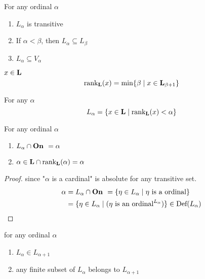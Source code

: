 \documentclass[11pt]{article}
\begin{document}
\begin{lemma}[]
For any ordinal \(\alpha\)
\begin{enumerate}
\item \(L_\alpha\) is transitive
\item If \(\alpha<\beta\), then \(L_\alpha\subseteq L_\beta\)
\item \(L_\alpha\subseteq V_\alpha\)
\end{enumerate}
\end{lemma}

\begin{definition}[]
\(x\in\textbf{L}\)
\begin{equation*}
\text{rank}_{\textbf{L}}(x)=\min\{\beta\mid x\in\textbf{L}_{\beta+1}\}
\end{equation*}
\end{definition}

\begin{lemma}[]
For any \(\alpha\)
\begin{equation*}
L_\alpha=\{x\in\textbf{L}\mid\text{rank}_{\textbf{L}}(x)<\alpha\}
\end{equation*}
\end{lemma}

\begin{lemma}[]
For any ordinal \(\alpha\)
\begin{enumerate}
\item \(L_\alpha\cap\textbf{On }=\alpha\)
\item \(\alpha\in\textbf{L}\cap\text{rank}_{\textbf{L}}(\alpha)=\alpha\)
\end{enumerate}
\end{lemma}

\begin{proof}
since "\(\alpha\) is a cardinal" is absolute for any transitive set. 
\begin{align*}
\alpha&=L_\alpha\cap\textbf{On }=\{\eta\in L_\alpha\mid\eta\text{ is a ordinal}\}\\
&=\{\eta\in L_\alpha\mid(\eta\text{ is an ordinal}^{L_\alpha})\}\in\text{Def}(L_\alpha)
\end{align*}
\end{proof}

\begin{lemma}[]
for any ordinal \(\alpha\)
\begin{enumerate}
\item \(L_\alpha\in L_{\alpha+1}\)
\item any finite subset of \(L_\alpha\) belongs to \(L_{\alpha+1}\)
\end{enumerate}
\end{lemma}
\end{document}
